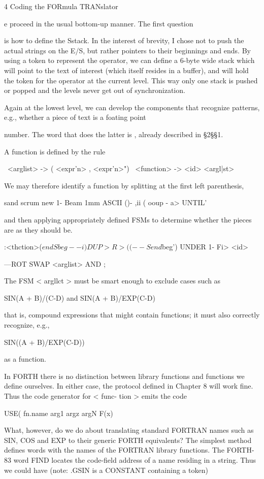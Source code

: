 4 Coding the FORmula TRANslator

e proceed in the usual bottom-up manner. The first question

is how to define the Sstack. In the interest of brevity, I chose
not to push the actual strings on the E/S, but rather pointers to
their beginnings and ends. By using a token to represent the
operator, we can define a 6-byte wide stack which will point to
the text of interest (which itself resides in a buffer), and will hold
the token for the operator at the current level. This way only one
stack is pushed or popped and the levels never get out of
synchronization.

Again at the lowest level, we can develop the components that
recognize patterns, e.g., whether a piece of text is a foating point

number. The word that does the latter is , already described
in §2§§1.

A function is defined by the rule

\ <arglist> -> ( <expr'n> {, <expr'n>}")
\ <function> -> <id> <argl|st>

We may therefore identify a function by splitting at the first left
parenthesis,

sand scrum new
1- Beam 1mm ASCII ()- ,ii (
ooup - a> UNTIL'

and then applying appropriately defined FSMs to determine
whether the pieces are as they should be.

:<thction>($endSbeg--i)
DUP>R >( (--Send$beg')
UNDER 1- Fi> <id>

—ROT SWAP <arglist> AND ;

The FSM < argllct > must be smart enough to exclude cases such
as

SIN(A + B)/(C-D)
and
SIN(A + B)/EXP(C-D)

that is, compound expressions that might contain functions; it
must also correctly recognize, e.g.,

SIN((A + B)/EXP(C-D))

as a function.

In FORTH there is no distinction between library functions and
functions we define ourselves. In either case, the protocol defined
in Chapter 8 will work fine. Thus the code generator for < func-
tion > emits the code

USE( fn.name arg1 argz argN F(x)

What, however, do we do about translating standard FORTRAN
names such as SIN, COS and EXP to their generic FORTH
equivalents? The simplest method defines words with the names
of the FORTRAN library functions. The FORTH-83 word FIND
locates the code-field address of a name residing in a string. Thus
we could have (note: .GSIN is a CONSTANT containing a token)

